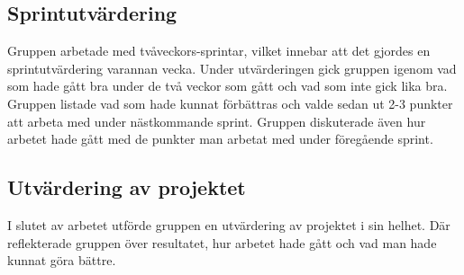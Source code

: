 \subsection{Sprintutvärdering}
Gruppen arbetade med tvåveckors-sprintar, vilket innebar att det gjordes en sprintutvärdering varannan vecka. Under utvärderingen gick gruppen igenom vad som hade gått bra under de två veckor som gått och vad som inte gick lika bra. Gruppen listade vad som hade kunnat förbättras och valde sedan ut 2-3 punkter att arbeta med under nästkommande sprint. Gruppen diskuterade även hur arbetet hade gått med de punkter man arbetat med under föregående sprint.

\subsection{Utvärdering av projektet}
I slutet av arbetet utförde gruppen en utvärdering av projektet i sin helhet. Där reflekterade gruppen över resultatet, hur arbetet hade gått och vad man hade kunnat göra bättre.
